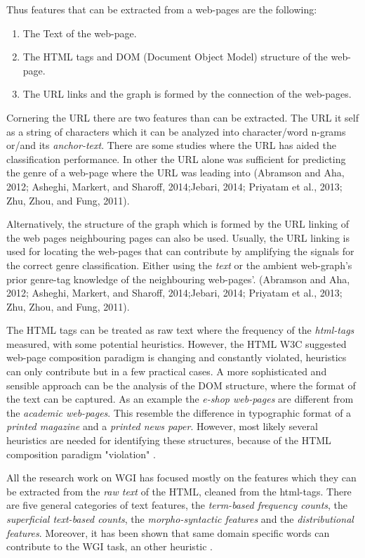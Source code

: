 Thus features that can be extracted from a web-pages are the following:

\begin{enumerate}
\item The Text of the web-page.
\item The HTML tags and DOM (Document Object Model) structure of the web-page. 
\item The URL links and the graph is formed by the connection of the web-pages.
\end{enumerate}

Cornering the URL there are two features than can be extracted. The URL it self as a string of characters which it can be analyzed into character/word n-grams or/and its \textit{anchor-text}. There are some studies where the URL has aided the classification performance. In other the URL alone was sufficient for predicting the genre of a web-page where the URL was leading into (Abramson and Aha, 2012; Asheghi, Markert, and Sharoff, 2014;Jebari, 2014; Priyatam et al., 2013; Zhu, Zhou, and Fung, 2011).

Alternatively, the structure of the graph which is formed by the URL linking of the web pages neighbouring pages can also be used. Usually, the URL linking is used for locating the web-pages that can contribute by amplifying the signals for the correct genre classification. Either using the \textit{text} or the ambient web-graph's prior genre-tag knowledge of the neighbouring web-pages'. (Abramson and Aha, 2012; Asheghi, Markert, and Sharoff, 2014;Jebari, 2014; Priyatam et al., 2013; Zhu, Zhou, and Fung, 2011).

The HTML tags can be treated as raw text where the frequency of the \textit{html-tags} measured, with some potential heuristics. However, the HTML W3C suggested web-page composition paradigm is changing and constantly violated, heuristics can only contribute but in a few practical cases. A more sophisticated and sensible approach can be the analysis of the DOM structure, where the format of the text can be captured. As an example the \textit{e-shop web-pages} are different from the \textit{academic web-pages}. This resemble the difference in typographic format of a \textit{printed magazine} and a \textit{printed news paper}. However, most likely several heuristics are needed for identifying these structures, because of the HTML composition paradigm "violation" \cite{mehler2011integrating,mehler2011integrating}.

All the research work on WGI has focused mostly on the features which they can be extracted from the \textit{raw text} of the  HTML, cleaned from the html-tags. There are five general categories of text features, the \textit{term-based frequency counts}, the \textit{superficial text-based counts}, the \textit{morpho-syntactic features} and the \textit{distributional features}. Moreover, it has been shown that same domain specific words can contribute to the WGI task, an other heuristic \cite{mason2009classifying,sharoff2010web,Sharroff2010,Nooralahzadeh2014,onan2018ensemble}. 

